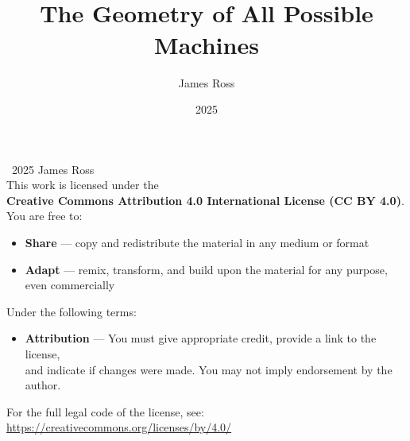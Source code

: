 \documentclass[11pt,oneside]{book}
\title{\COMPUTER{}\\[0.5em]\large The Geometry of All Possible Machines}
\author{James Ross}
\date{2025}
\theoremstyle{definition}
\theoremstyle{plain}
\theoremstyle{remark}
\begin{document}
\hypersetup{pageanchor=false} %

\frontmatter


\cleardoublepage
\thispagestyle{empty}

\begin{center}
{\small
\vspace*{\fill}

\textcopyright~2025 James Ross\\[0.75em]

This work is licensed under the\\
\textbf{Creative Commons Attribution 4.0 International License (CC BY 4.0)}.\\[1em]

You are free to:
\begin{itemize}[leftmargin=2em]
  \item \textbf{Share} — copy and redistribute the material in any medium or format
  \item \textbf{Adapt} — remix, transform, and build upon the material for any purpose, even commercially
\end{itemize}

Under the following terms:
\begin{itemize}[leftmargin=2em]
  \item \textbf{Attribution} — You must give appropriate credit, provide a link to the license,\\
        and indicate if changes were made. You may not imply endorsement by the author.
\end{itemize}

For the full legal code of the license, see:\\[0.25em]
\url{https://creativecommons.org/licenses/by/4.0/}

\vspace*{\fill}
}
\end{center}

\cleardoublepage

\hypersetup{pageanchor=true}
\setcounter{page}{1}



\mainmatter








































\backmatter

\end{document}

